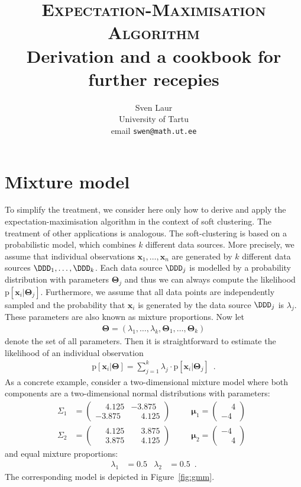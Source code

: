 \documentclass{article}
\title{\textsc{Expectation-Maximisation Algorithm}\\ Derivation and a cookbook for further recepies}
\author{Sven Laur\\ University of Tartu \\ email \texttt{swen@math.ut.ee}}
\renewcommand{\vec}[1]{\boldsymbol{#1}}
\newcommand{\pd}[1]{\mathrm{p}[#1]}
\begin{document}
\maketitle
\section{Mixture model}

To simplify the treatment, we consider here only how to derive and apply the expectation-maximisation algorithm in the context of soft clustering. The treatment of other applications is analogous. The soft-clustering is based on a probabilistic model, which combines $k$ different data sources. More precisely, we assume that individual observations $\vec{x}_1,\ldots,\vec{x}_n$ are generated by $k$ different data sources $\DDD_1,\ldots,\DDD_k$. Each data source $\DDD_j$ is modelled by a probability distribution with parameters $\vec{\Theta}_j$ and thus we can always compute the likelihood $\pd{\vec{x}_i|\vec{\Theta}_j}$. Furthermore, we assume that all data points are independently sampled and the probability that $\vec{x}_i$ is generated by the data source $\DDD_j$ is $\lambda_j$. These parameters are also known as mixture proportions. Now let
\begin{align*}
\vec{\Theta}=(\lambda_1,\ldots,\lambda_k,\vec{\Theta}_1,\ldots,\vec{\Theta}_k)
\end{align*}
denote the set of all parameters. Then it is straightforward to estimate the likelihood of an individual observation
\begin{align*}
\pd{\vec{x}_i|\vec{\Theta}}=\sum_{j=1}^k\lambda_j\cdot\pd{\vec{x}_i|\vec{\Theta}_j}\enspace.
\end{align*}
As a concrete example, consider a two-dimensional mixture model where both components are a two-dimensional normal distributions  with parameters:   
\begin{align*}
\Sigma_1&=
\begin{pmatrix}
 \phantom{-}4.125   &-3.875\\
 -3.875 &\phantom{-}4.125
\end{pmatrix}\enspace
\qquad
\vec{\mu}_1=
\begin{pmatrix}
\phantom{-}4\\
-4
\end{pmatrix}\enspace\\
\Sigma_2&=
\begin{pmatrix}
 \phantom{-}4.125   &\phantom{-}3.875\\
 \phantom{-}3.875 &\phantom{-}4.125
\end{pmatrix}\enspace
\qquad
\vec{\mu}_2=
\begin{pmatrix}
-4\\
\phantom{-}4
\end{pmatrix}\enspace
\end{align*}
and equal mixture proportions:
\begin{align*}
\lambda_1&=0.5 &
\lambda_2&=0.5\enspace.
\end{align*} 
The corresponding model is depicted in Figure~\ref{fig:gmm}.
\end{document}
